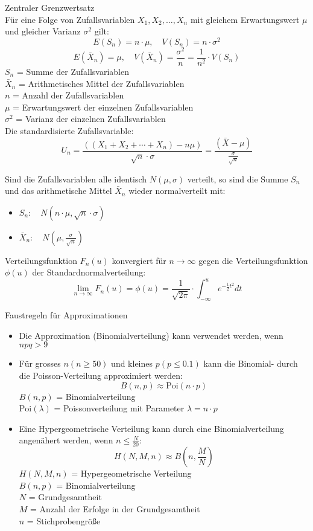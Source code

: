 \begin{theorem}{Zentraler Grenzwertsatz}\\
Für eine Folge von Zufallsvariablen $X_1, X_2, \ldots, X_n$ mit gleichem Erwartungswert $\mu$ und gleicher Varianz $\sigma^2$ gilt:
$$
E(S_n)=n \cdot \mu, \quad V(S_n)=n \cdot \sigma^2
$$
$$
E(\bar{X}_n)=\mu, \quad V(\bar{X}_n)=\frac{\sigma^2}{n}=\frac{1}{n^2} \cdot V(S_n)
$$
$S_n$ = Summe der Zufallsvariablen\\
$\bar{X}_n$ = Arithmetisches Mittel der Zufallsvariablen\\
$n$ = Anzahl der Zufallsvariablen\\
$\mu$ = Erwartungswert der einzelnen Zufallsvariablen\\
$\sigma^2$ = Varianz der einzelnen Zufallsvariablen\\

Die standardisierte Zufallsvariable:
$$
U_n=\frac{((X_1+X_2+\cdots+X_n)-n\mu)}{\sqrt{n} \cdot \sigma}=\frac{(\bar{X}-\mu)}{\frac{\sigma}{\sqrt{n}}}
$$

Sind die Zufallsvariablen alle identisch $N(\mu,\sigma)$ verteilt, so sind die Summe $S_n$ und das arithmetische Mittel $\bar{X}_n$ wieder normalverteilt mit:
\begin{itemize}
  \item $S_n: \quad N(n \cdot \mu, \sqrt{n} \cdot \sigma)$
  \item $\bar{X}_n: \quad N(\mu, \frac{\sigma}{\sqrt{n}})$
\end{itemize}

Verteilungsfunktion $F_n(u)$ konvergiert für $n \to \infty$ gegen die Verteilungsfunktion $\phi(u)$ der Standardnormalverteilung:
$$
\lim_{n\to\infty} F_n(u) = \phi(u) = \frac{1}{\sqrt{2\pi}} \cdot \int_{-\infty}^u e^{-\frac{1}{2}t^2} dt
$$
\end{theorem}

\begin{concept}{Faustregeln für Approximationen}
\begin{itemize}
  \item Die Approximation (Binomialverteilung) kann verwendet werden, wenn $npq > 9$
  \item Für grosses $n(n \geq 50)$ und kleines $p(p \leq 0.1)$ kann die Binomial- durch die Poisson-Verteilung approximiert werden:
  $$
  B(n,p) \approx \text{Poi}(n \cdot p)
  $$
  $B(n,p)$ = Binomialverteilung\\
  $\text{Poi}(\lambda)$ = Poissonverteilung mit Parameter $\lambda = n \cdot p$\\
  
  \item Eine Hypergeometrische Verteilung kann durch eine Binomialverteilung angenähert werden, wenn $n \leq \frac{N}{20}$:
  $$
  H(N,M,n) \approx B(n,\frac{M}{N})
  $$
  $H(N,M,n)$ = Hypergeometrische Verteilung\\
  $B(n,p)$ = Binomialverteilung\\
  $N$ = Grundgesamtheit\\
  $M$ = Anzahl der Erfolge in der Grundgesamtheit\\
  $n$ = Stichprobengröße\\
\end{itemize}
\end{concept}

